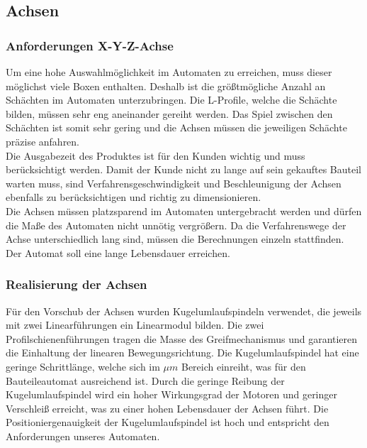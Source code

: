 \documentclass{scrartcl}
\begin{document}
 


 

\subsection{Achsen}

\subsubsection{Anforderungen X-Y-Z-Achse}

Um eine hohe Auswahlmöglichkeit im Automaten zu erreichen, muss dieser möglichst viele Boxen enthalten. Deshalb ist die größtmögliche Anzahl an Schächten im Automaten unterzubringen. Die L-Profile, welche die Schächte bilden, müssen sehr eng aneinander gereiht werden. Das Spiel zwischen den Schächten ist somit sehr gering und die Achsen müssen die jeweiligen Schächte präzise anfahren. \\
Die Ausgabezeit des Produktes ist für den Kunden wichtig und muss berücksichtigt werden. Damit der Kunde nicht zu lange auf sein gekauftes Bauteil warten muss, sind Verfahrensgeschwindigkeit und Beschleunigung der Achsen ebenfalls zu berücksichtigen und richtig zu dimensionieren. \\
Die Achsen müssen platzsparend im Automaten untergebracht werden und dürfen die Maße des Automaten nicht unnötig
vergrößern. Da die Verfahrenswege der Achse unterschiedlich lang sind, müssen die Berechnungen einzeln stattfinden. 
Der Automat soll eine lange Lebensdauer erreichen.\\



\subsubsection{Realisierung der Achsen}




Für den Vorschub der Achsen wurden Kugelumlaufspindeln verwendet, die jeweils mit zwei Linearführungen ein 
Linearmodul bilden. Die zwei Profilschienenführungen tragen die Masse des Greifmechanismus und garantieren die Einhaltung der linearen Bewegungsrichtung. Die Kugelumlaufspindel hat eine geringe Schrittlänge, welche sich im $\mu m$ Bereich einreiht, was für den Bauteileautomat ausreichend ist. Durch die geringe Reibung der Kugelumlaufspindel wird ein hoher Wirkungsgrad der Motoren und geringer Verschleiß erreicht, was zu einer hohen Lebensdauer der Achsen führt. Die Positioniergenauigkeit der Kugelumlaufspindel ist hoch und entspricht den Anforderungen unseres Automaten.\\
\end{document}

